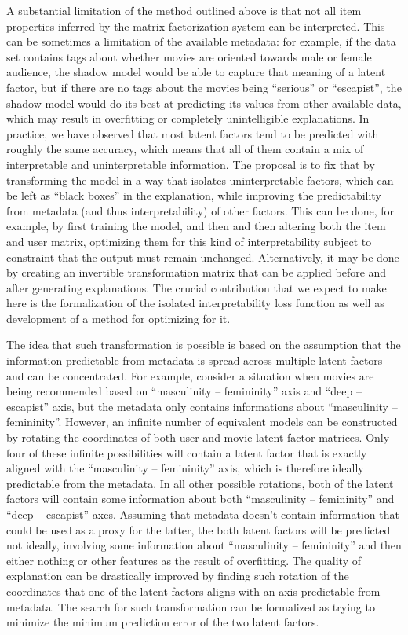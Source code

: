 A substantial limitation of the method outlined above is that not all
item properties inferred by the matrix factorization system can be interpreted.
This can be sometimes a limitation of the available metadata: for example,
if the data set contains tags about whether movies are oriented towards male or
female audience, the shadow model would be able to capture that meaning of a
latent factor, but if there are no tags about the movies being ``serious'' or
``escapist'', the shadow model would do its best at predicting its values from
other available data, which may result in overfitting or completely
unintelligible explanations. In practice, we have observed that most latent
factors tend to be predicted with roughly the same accuracy, which means that
all of them contain a mix of interpretable and uninterpretable information. The
proposal is to fix that by transforming the model in a way that isolates
uninterpretable factors, which can be left as ``black boxes'' in the
explanation, while improving the predictability from metadata (and thus
interpretability) of other factors. This can be done, for example, by first
training the model, and then and then altering both the item and user matrix,
optimizing them for this kind of interpretability
subject to constraint that the output must remain unchanged. Alternatively, it
may be done by creating an invertible transformation matrix that can be applied
before and after generating explanations. The crucial contribution that we
expect to make here is the formalization of the isolated interpretability loss
function as well as development of a method for optimizing for it.

The idea that such transformation is possible is based on the assumption that
the information predictable from metadata is spread across multiple latent
factors and can be concentrated. For example, consider a situation when movies
are being recommended based on ``masculinity -- femininity'' axis and
``deep -- escapist'' axis, but the metadata only contains informations about
``masculinity -- femininity''. However, an infinite number of equivalent models
can be constructed by rotating the coordinates of both user and movie latent
factor matrices. Only four of these infinite possibilities will contain a latent
factor that is exactly aligned with the ``masculinity -- femininity'' axis,
which is therefore ideally predictable from the metadata. In all other possible
rotations, both of the latent factors will contain some information about both
``masculinity -- femininity'' and ``deep -- escapist'' axes. Assuming that
metadata doesn't contain information that could be used as a proxy for the
latter, the both latent factors will be predicted not ideally, involving some
information about ``masculinity -- femininity'' and then either nothing or
other features as the result of overfitting. The quality of explanation can be
drastically improved by finding such rotation of the coordinates that one of the
latent factors aligns with an axis predictable from metadata. The search for
such transformation can be formalized as trying to minimize the minimum
prediction error of the two latent factors.

